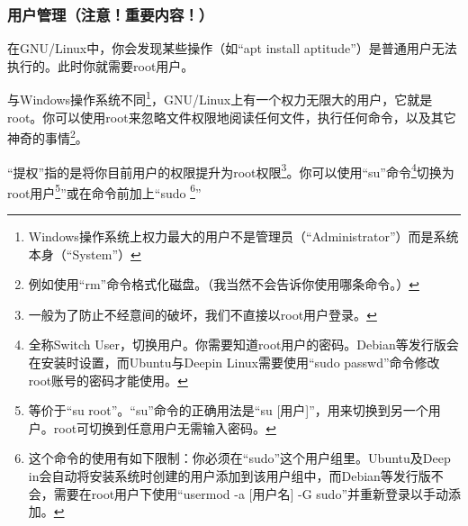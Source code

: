 \documentclass{book}
\begin{document}
\subsubsection{用户管理（注意！重要内容！）}
\cite{DebianRef}\par
在GNU/Linux中，你会发现某些操作（如“apt install aptitude”）是普通用户无法执行的。此时你就需要root用户。\par
与Windows操作系统不同\footnote{Windows操作系统上权力最大的用户不是管理员（“Administrator”）而是系统本身（“System”）}，GNU/Linux上有一个权力无限大的用户，它就是root。你可以使用root来忽略文件权限地阅读任何文件，执行任何命令，以及其它神奇的事情\footnote{例如使用“rm”命令格式化磁盘。{\color{red}{警告！这么做将会摧毁整个操作系统！}}（我当然不会告诉你使用哪条命令。）}。\par
“提权”指的是将你目前用户的权限提升为root权限\footnote{一般为了防止不经意间的破坏，我们不直接以root用户登录。}。你可以使用“su”命令\footnote{全称Switch User，切换用户。你需要知道root用户的密码。Debian等发行版会在安装时设置，而Ubuntu与Deepin Linux需要使用“sudo passwd”命令修改root账号的密码才能使用。}切换为root用户\footnote{等价于“su root”。“su”命令的正确用法是“su [用户]”，用来切换到另一个用户。root可切换到任意用户无需输入密码。}”或在命令前加上“sudo \footnote{这个命令的使用有如下限制：你必须在“sudo”这个用户组里。Ubuntu及Deep in会自动将安装系统时创建的用户添加到该用户组中，而Debian等发行版不会，需要在root用户下使用“usermod -a [用户名] -G sudo”并重新登录以手动添加。}”\par
{}\par
\end{document}
